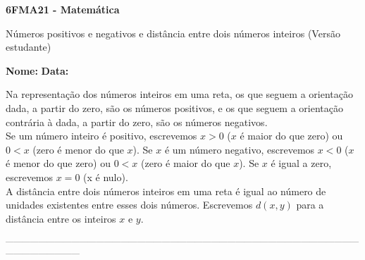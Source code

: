\documentclass[a4paper,14pt]{article}
\begin{document}
	
	\noindent\textbf{6FMA21 - Matemática} 
	
	\begin{center}Números positivos e negativos e distância entre dois números inteiros (Versão estudante)
	\end{center}
	
	\noindent\textbf{Nome:} \underline{\hspace{10cm}}
	\noindent\textbf{Data:} \underline{\hspace{4cm}}
	
	
	\begin{multicols}{2}
		\noindent Na representação dos números inteiros em uma reta, os que seguem a orientação dada, a partir do zero, são os números positivos, e os que seguem a orientação contrária à dada, a partir do zero, são os números negativos. \\
		Se um número inteiro é positivo, escrevemos $x > 0$ ($x$ é maior do que zero) ou $0 < x$ (zero é menor do que $x$). Se $x$ é um número negativo, escrevemos $x < 0$ ($x$ é menor do que zero) ou $0 < x$ (zero é maior do que $x$). Se $x$ é igual a zero, escrevemos $x = 0$ (x é nulo). \\
		A distância entre dois números inteiros em uma reta é igual ao número de unidades existentes entre esses dois números. Escrevemos $d (x, y)$ para a distância entre os inteiros $x$ e $y$.
	\end{multicols}
		\noindent\textsubscript{------------------------------------------------------------------------------------------------------------------------------------------------------------}
\end{document}

